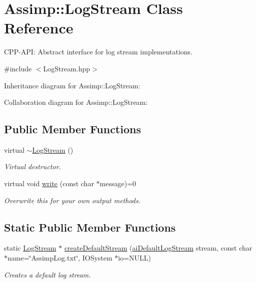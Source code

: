 \hypertarget{class_assimp_1_1_log_stream}{\section{Assimp\-:\-:Log\-Stream Class Reference}
\label{class_assimp_1_1_log_stream}
}


C\-P\-P-\/\-A\-P\-I\-: Abstract interface for log stream implementations.  




{\ttfamily \#include $<$Log\-Stream.\-hpp$>$}



Inheritance diagram for Assimp\-:\-:Log\-Stream\-:


Collaboration diagram for Assimp\-:\-:Log\-Stream\-:
\subsection*{Public Member Functions}
\begin{DoxyCompactItemize}
\item 
\hypertarget{class_assimp_1_1_log_stream_a72cabcadc78dcbdd54b5641703057ee7}{virtual \hyperlink{class_assimp_1_1_log_stream_a72cabcadc78dcbdd54b5641703057ee7}{$\sim$\-Log\-Stream} ()}\label{class_assimp_1_1_log_stream_a72cabcadc78dcbdd54b5641703057ee7}

\begin{DoxyCompactList}\small\item\em Virtual destructor. \end{DoxyCompactList}\item 
virtual void \hyperlink{class_assimp_1_1_log_stream_ab0bfcb5ab9988ef65d7222a50f6e8d37}{write} (const char $\ast$message)=0
\begin{DoxyCompactList}\small\item\em Overwrite this for your own output methods. \end{DoxyCompactList}\end{DoxyCompactItemize}
\subsection*{Static Public Member Functions}
\begin{DoxyCompactItemize}
\item 
static \hyperlink{class_assimp_1_1_log_stream}{Log\-Stream} $\ast$ \hyperlink{class_assimp_1_1_log_stream_a6b358a4a79b2e9ba2025e10d3e9405e3}{create\-Default\-Stream} (\hyperlink{types_8h_ae4271f61a7c06cd4770fc3e11f58f9c6}{ai\-Default\-Log\-Stream} stream, const char $\ast$name=\char`\"{}Assimp\-Log.\-txt\char`\"{}, I\-O\-System $\ast$io=N\-U\-L\-L)
\begin{DoxyCompactList}\small\item\em Creates a default log stream. \end{DoxyCompactList}\end{DoxyCompactItemize}
